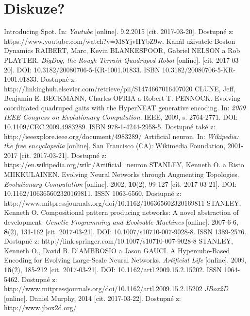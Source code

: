 \documentclass[a4]{article}
\begin{document}
\section{Diskuze?}
\begin{thebibliography}{8}
Introducing Spot. In: \textit{Youtube} [online]. 9.2.2015 [cit. 2017-03-20]. Dostupné z: https://www.youtube.com/watch?v=M8YjvHYbZ9w. Kanál uživatele Boston Dynamics
RAIBERT, Marc, Kevin BLANKESPOOR, Gabriel NELSON a Rob PLAYTER. \textit{BigDog, the Rough-Terrain Quadruped Robot} [online]. [cit. 2017-03-20]. DOI: 10.3182/20080706-5-KR-1001.01833. ISBN 10.3182/20080706-5-KR-1001.01833. Dostupné z: http://linkinghub.elsevier.com/retrieve/pii/S1474667016407020
CLUNE, Jeff, Benjamin E. BECKMANN, Charles OFRIA a Robert T. PENNOCK. Evolving coordinated quadruped gaits with the HyperNEAT generative encoding. In: \textit{2009 IEEE Congress on Evolutionary Computation}. IEEE, 2009, s. 2764-2771. DOI: 10.1109/CEC.2009.4983289. ISBN 978-1-4244-2958-5. Dostupné také z: http://ieeexplore.ieee.org/document/4983289/
Artificial neuron. In: \textit{Wikipedia: the free encyclopedia} [online]. San Francisco (CA): Wikimedia Foundation, 2001-2017 [cit. 2017-03-21]. Dostupné z: https://en.wikipedia.org/wiki/Artificial\_neuron
STANLEY, Kenneth O. a Risto MIIKKULAINEN. Evolving Neural Networks through Augmenting Topologies. \emph{Evolutionary Computation} [online]. 2002, \textbf{10}(2), 99-127 [cit. 2017-03-21]. DOI: 10.1162/106365602320169811. ISSN 1063-6560. Dostupné z: http://www.mitpressjournals.org/doi/10.1162/106365602320169811
STANLEY, Kenneth O. Compositional pattern producing networks: A novel abstraction of development. \emph{Genetic Programming and Evolvable Machines} [online]. 2007-6-6, \textbf{8}(2), 131-162 [cit. 2017-03-21]. DOI: 10.1007/s10710-007-9028-8. ISSN 1389-2576. Dostupné z: http://link.springer.com/10.1007/s10710-007-9028-8
STANLEY, Kenneth O., David B. D'AMBROSIO a Jason GAUCI. A Hypercube-Based Encoding for Evolving Large-Scale Neural Networks. \textit{Artificial Life} [online]. 2009, \textbf{15}(2), 185-212 [cit. 2017-03-21]. DOI: 10.1162/artl.2009.15.2.15202. ISSN 1064-5462. Dostupné z: http://www.mitpressjournals.org/doi/10.1162/artl.2009.15.2.15202
\textit{JBox2D} [online]. Daniel Murphy, 2014 [cit. 2017-03-22]. Dostupné z: http://www.jbox2d.org/
\end{thebibliography}
\end{document}
